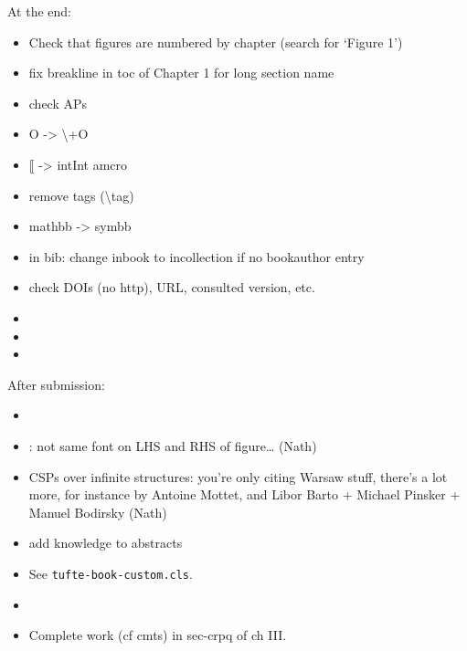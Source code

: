 At the end:
\begin{itemize}
	\item Check that figures are numbered by chapter (search for `Figure 1')
	\item fix breakline in toc of Chapter 1 for long section name
	\item check APs 
	\item O -> \backslash+O
	\item $\lBrack$ -> intInt amcro
	\item remove tags (\textsf{\backslash tag})
	\item mathbb -> symbb
	\item in bib: change inbook to incollection if no bookauthor entry
	\item check DOIs (no http), URL, consulted version, etc.
	\item {}
	\item {}
	\item {}
\end{itemize}

After submission:
\begin{itemize}
	\item {}
	\item {}: not same font on LHS and RHS of figure… (Nath)
	\item CSPs over infinite structures: you're only citing Warsaw stuff, there's a lot more, for instance by Antoine Mottet, and Libor Barto + Michael Pinsker + Manuel Bodirsky (Nath)
	\item add knowledge to abstracts
	\item {}
		See \texttt{tufte-book-custom.cls}.
	\item {}
	\item Complete work (cf cmts) in sec-crpq of ch III.
\end{itemize}